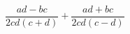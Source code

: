 \begin{ex}[type=expression]
	\begin{condition}
		\( \dfrac{ad-bc}{2cd(c+d)}+\dfrac{ad+bc}{2cd(c-d)} \)
	\end{condition}
\end{ex}